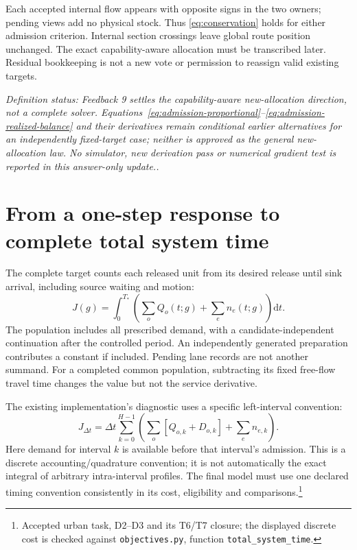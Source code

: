 \documentclass[11pt]{article}
\newcommand{\dd}{\mathrm d}
\newcommand{\status}[1]{\textit{Definition status: #1.}}
\begin{document}
Each accepted internal flow appears with opposite signs in the two owners; pending views add no physical stock. Thus \eqref{eq:conservation} holds for either admission criterion. Internal section crossings leave global route position unchanged. The exact capability-aware allocation must be transcribed later. Residual bookkeeping is not a new vote or permission to reassign valid existing targets.

\status{Feedback 9 settles the capability-aware new-allocation direction, not a complete solver. Equations~\eqref{eq:admission-proportional}--\eqref{eq:admission-realized-balance} and their derivatives remain conditional earlier alternatives for an independently fixed-target case; neither is approved as the general new-allocation law. No simulator, new derivation pass or numerical gradient test is reported in this answer-only update.}

\section{From a one-step response to complete total system time}

The complete target counts each released unit from its desired release until sink arrival, including source waiting and motion:
\begin{equation}
 J(g)=\int_0^{T_*}\left(\sum_o Q_o(t;g)+\sum_e n_e(t;g)\right)\dd t.
 \label{eq:continuous-tst}
\end{equation}
The population includes all prescribed demand, with a candidate-independent continuation after the controlled period. An independently generated preparation contributes a constant if included. Pending lane records are not another summand. For a completed common population, subtracting its fixed free-flow travel time changes the value but not the service derivative.

The existing implementation's diagnostic uses a specific left-interval convention:
\begin{equation}
 J_{\Delta t}=\Delta t\sum_{k=0}^{H-1}
 \left(\sum_o[Q_{o,k}+D_{o,k}]+\sum_e n_{e,k}\right).
 \label{eq:discrete-tst}
\end{equation}
Here demand for interval $k$ is available before that interval's admission. This is a discrete accounting/quadrature convention; it is not automatically the exact integral of arbitrary intra-interval profiles. The final model must use one declared timing convention consistently in its cost, eligibility and comparisons.\footnote{Accepted urban task, D2--D3 and its T6/T7 closure; the displayed discrete cost is checked against \texttt{objectives.py}, function \texttt{total\_system\_time}.}
\end{document}
